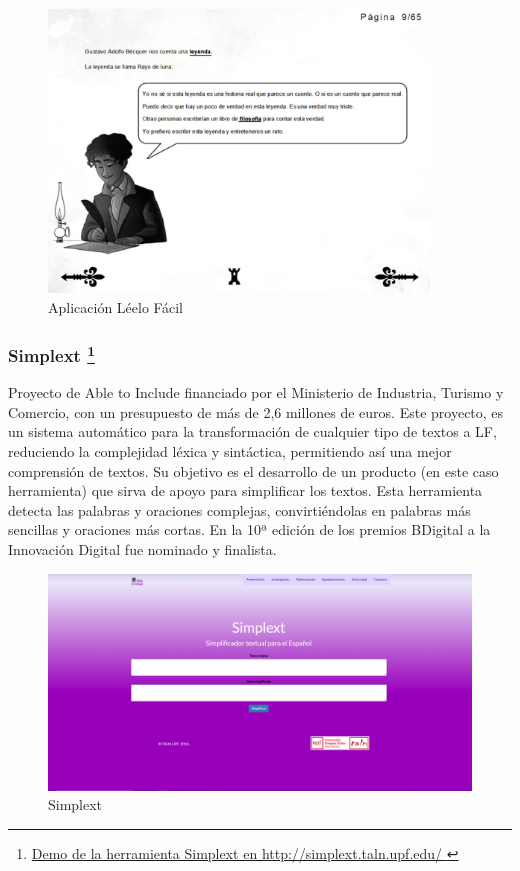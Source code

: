 \begin{figure}[h]
	\centering
	\includegraphics[width=0.9\textwidth]{Imagenes/ProyectosMateriales/leeloFacil}
	\caption{Aplicación Léelo Fácil}
	\label{fig:leeloFacil}
\end{figure} 
\newpage
\subsubsection{Simplext \footnote{\href{http://simplext.taln.upf.edu/}{Demo de la herramienta Simplext en http://simplext.taln.upf.edu/ }}}

Proyecto de Able to Include financiado por el Ministerio de Industria, Turismo y Comercio, con un presupuesto de más de 2,6 millones de euros. Este proyecto, es un sistema automático para la transformación de cualquier tipo de textos a LF, reduciendo la complejidad léxica y sintáctica, permitiendo así una mejor comprensión de textos. Su objetivo es el desarrollo de un producto (en este caso herramienta) que sirva de apoyo para simplificar los textos. Esta herramienta detecta las palabras y oraciones complejas, convirtiéndolas en palabras más sencillas y oraciones más cortas. En la 10ª edición de los premios BDigital a la Innovación Digital fue nominado y finalista.

\begin{figure}[h]
	\centering
	\includegraphics[width=1.0\textwidth]{Imagenes/ProyectosMateriales/simplext}
	\caption{Simplext}
	\label{fig:simplext}
\end{figure} 

